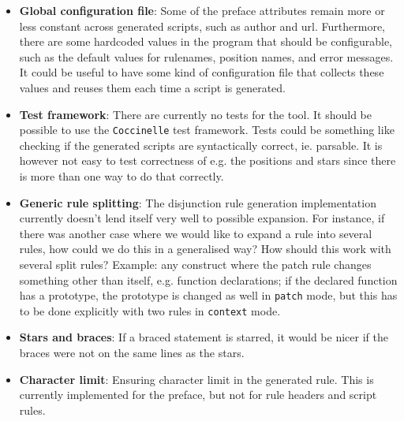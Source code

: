 \begin{itemize}
\item \textbf{Global configuration file}: Some of the preface attributes remain more or less constant across generated scripts, such as author and url. Furthermore, there are some hardcoded values in the program that should be configurable, such as the default values for rulenames, position names, and error messages.\newline
It could be useful to have some kind of configuration file that collects these values and reuses them each time a script is generated.
\item \textbf{Test framework}: There are currently no tests for the tool. It should be possible to use the \texttt{Coccinelle} test framework. Tests could be something like checking if the generated scripts are syntactically correct, ie. parsable. It is however not easy to test correctness of e.g. the positions and stars since there is more than one way to do that correctly.
\item \textbf{Generic rule splitting}: The disjunction rule generation implementation currently doesn't lend itself very well to possible expansion. For instance, if there was another case where we would like to expand a rule into several rules, how could we do this in a generalised way? How should this work with several split rules?\newline
Example: any construct where the patch rule changes something other than itself, e.g. function declarations; if the declared function has a prototype, the prototype is changed as well in \texttt{patch} mode, but this has to be done explicitly with two rules in \texttt{context} mode.
\item \textbf{Stars and braces}: If a braced statement is starred, it would be nicer if the braces were not on the same lines as the stars.
\item \textbf{Character limit}: Ensuring character limit in the generated rule. This is currently implemented for the preface, but not for rule headers and script rules.
\end{itemize}
